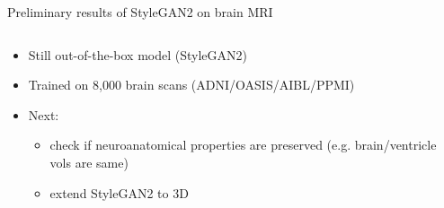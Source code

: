 \documentclass[8pt,xcolor=table,aspectratio=169]{beamer}
\begin{document}
\begin{frame}{Preliminary results of StyleGAN2 on brain MRI}
\begin{columns}
\begin{column}{0.45\textwidth}
\end{column}
\end{columns}

\begin{itemize}
\item Still out-of-the-box model (StyleGAN2)
\item Trained on 8,000 brain scans (ADNI/OASIS/AIBL/PPMI)
\item Next:
  \begin{itemize}
  \item check if neuroanatomical properties are preserved (e.g. brain/ventricle vols are same)
  \item extend StyleGAN2 to 3D
  \end{itemize}
\end{itemize}
\vspace{1em}

\end{frame}
\end{document}
